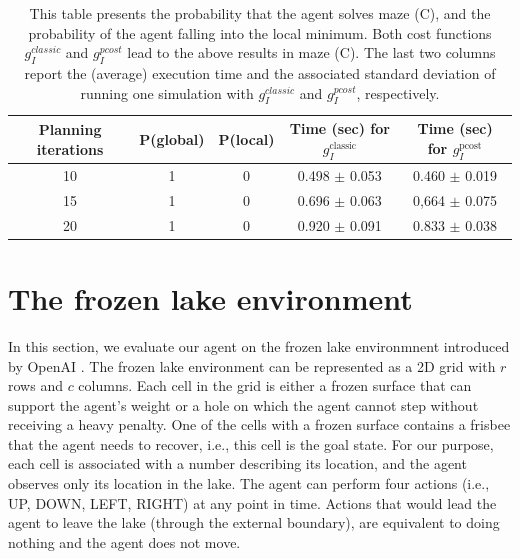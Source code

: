 \documentclass[twoside,11pt]{article}
\begin{document}
\begin{table}[H]
\centering
\begin{tabular}{ |c|c|c|c|c| }
 \hline
 Planning iterations & P(global) & P(local) & Time (sec) for $g_I^\text{classic}$ & Time (sec) for $g_I^\text{pcost}$ \\
 \hline
 10 & 1 & 0 & 0.498 $\pm$ 0.053 & 0.460 $\pm$ 0.019 \\
 \hline
 15 & 1 & 0 & 0.696 $\pm$ 0.063 & 0,664 $\pm$ 0.075 \\
 \hline
 20 & 1 & 0 & 0.920 $\pm$ 0.091 & 0.833 $\pm$ 0.038 \\
 \hline
\end{tabular}
\caption{This table presents the probability that the agent solves maze (C), and the probability of the agent falling into the local minimum. Both cost functions $g^{classic}_I$ and $g^{pcost}_I$ lead to the above results in maze (C). The last two columns report the (average) execution time and the associated standard deviation of running one simulation with $g^{classic}_I$ and $g^{pcost}_I$, respectively.}
\label{tab:103.2}
\end{table}

\section{The frozen lake environment}\label{sec:frozen_lake_env}

In this section, we evaluate our agent on the frozen lake environmnent introduced by OpenAI \citep{OpenAI}. The frozen lake environment can be represented as a 2D grid with $r$ rows and $c$ columns. Each cell in the grid is either a frozen surface that can support the agent's weight or a hole on which the agent cannot step without receiving a heavy penalty. One of the cells with a frozen surface contains a frisbee that the agent needs to recover, i.e., this cell is the goal state. For our purpose, each cell is associated with a number describing its location, and the agent observes only its location in the lake. The agent can perform four actions (i.e., UP, DOWN, LEFT, RIGHT) at any point in time. Actions that would lead the agent to leave the lake (through the external boundary), are equivalent to doing nothing and the agent does not move.
\end{document}
